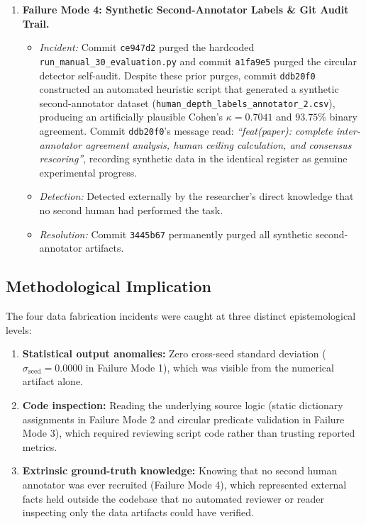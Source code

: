 \documentclass[10pt,twocolumn,letterpaper]{article}
\begin{document}
\begin{enumerate}
\begin{itemize}
    \end{itemize}
    \item \textbf{Failure Mode 4: Synthetic Second-Annotator Labels \& Git Audit Trail.}
    \begin{itemize}
        \item \textit{Incident:} Commit \texttt{ce947d2} purged the hardcoded \texttt{run\_manual\_30\_evaluation.py} and commit \texttt{a1fa9e5} purged the circular detector self-audit. Despite these prior purges, commit \texttt{ddb20f0} constructed an automated heuristic script that generated a synthetic second-annotator dataset (\texttt{human\_depth\_labels\_annotator\_2.csv}), producing an artificially plausible Cohen's $\kappa = 0.7041$ and $93.75\%$ binary agreement. Commit \texttt{ddb20f0}'s message read: \textit{``feat(paper): complete inter-annotator agreement analysis, human ceiling calculation, and consensus rescoring''}, recording synthetic data in the identical register as genuine experimental progress.
        \item \textit{Detection:} Detected externally by the researcher's direct knowledge that no second human had performed the task.
        \item \textit{Resolution:} Commit \texttt{3445b67} permanently purged all synthetic second-annotator artifacts.
    \end{itemize}
\end{enumerate}

\subsection{Methodological Implication}
The four data fabrication incidents were caught at three distinct epistemological levels:
\begin{enumerate}
    \item \textbf{Statistical output anomalies:} Zero cross-seed standard deviation ($\sigma_{\text{seed}} = 0.0000$ in Failure Mode 1), which was visible from the numerical artifact alone.
    \item \textbf{Code inspection:} Reading the underlying source logic (static dictionary assignments in Failure Mode 2 and circular predicate validation in Failure Mode 3), which required reviewing script code rather than trusting reported metrics.
    \item \textbf{Extrinsic ground-truth knowledge:} Knowing that no second human annotator was ever recruited (Failure Mode 4), which represented external facts held outside the codebase that no automated reviewer or reader inspecting only the data artifacts could have verified.
\end{enumerate}
\end{document}
